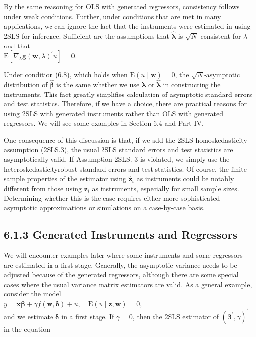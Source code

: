 \documentclass[10pt]{article}
\begin{document}
By the same reasoning for OLS with generated regressors, consistency follows under weak conditions. Further, under conditions that are met in many applications, we can ignore the fact that the instruments were estimated in using 2SLS for inference. Sufficient are the assumptions that $\hat{\boldsymbol{\lambda}}$ is $\sqrt{N}$-consistent for $\lambda$ and that\\
$\mathrm{E}\left[\nabla_{\lambda} \mathbf{g}(\mathbf{w}, \lambda)^{\prime} u\right]=\mathbf{0}$.

Under condition (6.8), which holds when $\mathrm{E}(u \mid \mathbf{w})=0$, the $\sqrt{N}$-asymptotic distribution of $\hat{\boldsymbol{\beta}}$ is the same whether we use $\boldsymbol{\lambda}$ or $\hat{\boldsymbol{\lambda}}$ in constructing the instruments. This fact greatly simplifies calculation of asymptotic standard errors and test statistics. Therefore, if we have a choice, there are practical reasons for using 2SLS with generated instruments rather than OLS with generated regressors. We will see some examples in Section 6.4 and Part IV.

One consequence of this discussion is that, if we add the 2SLS homoskedasticity assumption (2SLS.3), the usual 2SLS standard errors and test statistics are asymptotically valid. If Assumption 2SLS. 3 is violated, we simply use the heteroskedasticityrobust standard errors and test statistics. Of course, the finite sample properties of the estimator using $\hat{\mathbf{z}}_{i}$ as instruments could be notably different from those using $\mathbf{z}_{i}$ as instruments, especially for small sample sizes. Determining whether this is the case requires either more sophisticated asymptotic approximations or simulations on a case-by-case basis.

\subsection*{6.1.3 Generated Instruments and Regressors}
We will encounter examples later where some instruments and some regressors are estimated in a first stage. Generally, the asymptotic variance needs to be adjusted because of the generated regressors, although there are some special cases where the usual variance matrix estimators are valid. As a general example, consider the model\\
$y=\mathbf{x} \boldsymbol{\beta}+\gamma f(\mathbf{w}, \boldsymbol{\delta})+u, \quad \mathrm{E}(u \mid \mathbf{z}, \mathbf{w})=0$,\\
and we estimate $\boldsymbol{\delta}$ in a first stage. If $\gamma=0$, then the 2SLS estimator of $\left(\boldsymbol{\beta}^{\prime}, \gamma\right)^{\prime}$ in the equation
\end{document}
